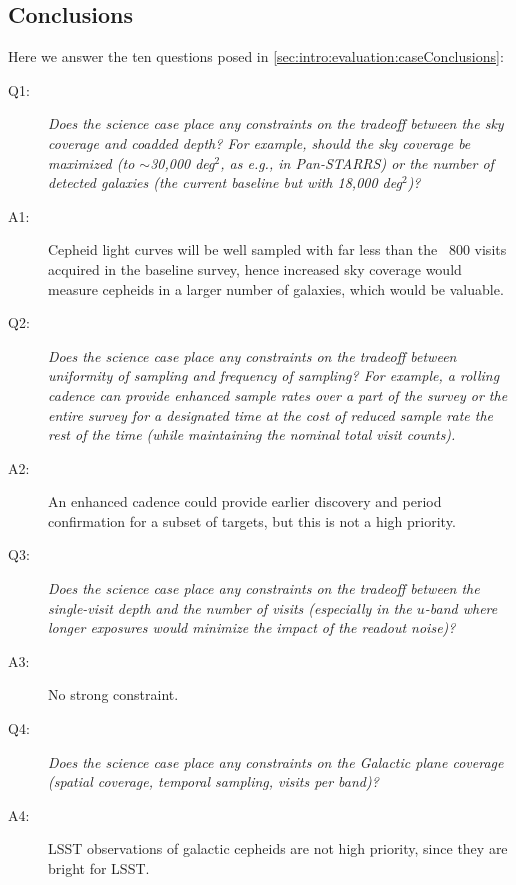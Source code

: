  \subsection{Conclusions}

 Here we answer the ten questions posed in
 \autoref{sec:intro:evaluation:caseConclusions}:

 \begin{description}

 \item[Q1:] {\it Does the science case place any constraints on the
 tradeoff between the sky coverage and coadded depth? For example, should
 the sky coverage be maximized (to $\sim$30,000 deg$^2$, as e.g., in
 Pan-STARRS) or the number of detected galaxies (the current baseline but
 with 18,000 deg$^2$)?}

 \item[A1:] Cepheid light curves will be well sampled with far less than the ~800 visits acquired in the baseline survey, hence increased sky coverage would measure cepheids in a larger number of galaxies, which would be valuable.

 \item[Q2:] {\it Does the science case place any constraints on the
 tradeoff between uniformity of sampling and frequency of  sampling? For
 example, a rolling cadence can provide enhanced sample rates over a part
 of the survey or the entire survey for a designated time at the cost of
 reduced sample rate the rest of the time (while maintaining the nominal
 total visit counts).}

 \item[A2:] An enhanced cadence could provide earlier discovery and period confirmation for a subset of targets, but this is
not a high priority.

 \item[Q3:] {\it Does the science case place any constraints on the
 tradeoff between the single-visit depth and the number of visits
 (especially in the $u$-band where longer exposures would minimize the
 impact of the readout noise)?}

 \item[A3:] No strong constraint.

 \item[Q4:] {\it Does the science case place any constraints on the
 Galactic plane coverage (spatial coverage, temporal sampling, visits per
 band)?}

 \item[A4:] LSST observations of galactic cepheids are not high priority, since they are bright for LSST.


\end{description}
